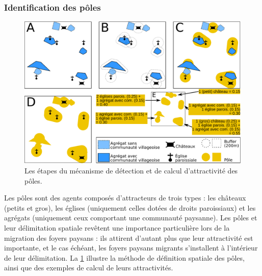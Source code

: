 	\subsubsection{Identification des pôles \label{sssec:poles}}

\begin{figure}[H]
	\centering
	\includegraphics[width=\linewidth]{img/detection_poles.pdf}
	\caption{Les étapes du mécanisme de détection et de calcul d'attractivité des pôles.}
	\label{fig:detection-poles}
\end{figure}
\vspace*{-.5cm}	

Les pôles sont des agents composés d'attracteurs de trois types : les châteaux (petits et gros), les églises (uniquement celles dotées de droits paroissiaux) et les agrégats (uniquement ceux comportant une communauté paysanne).
Les pôles et leur délimitation spatiale revêtent une importance particulière lors de la migration des foyers paysans : ils attirent d'autant plus que leur attractivité est importante, et le cas échéant, les foyers paysans migrants s'installent à l'intérieur de leur délimitation.
La \cref{fig:detection-poles} illustre la méthode de définition spatiale des pôles, ainsi que des exemples de calcul de leurs attractivités.

